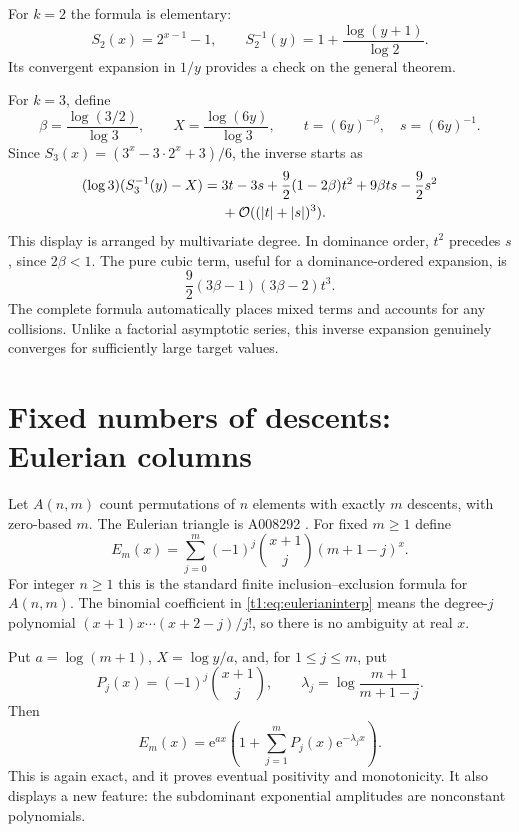 \documentclass[11pt,openany]{book}
\numberwithin{equation}{chapter}
\theoremstyle{plain}
\theoremstyle{definition}
\theoremstyle{remark}
\newcommand{\ee}{\mathrm e}
\begin{document}
For $k=2$ the formula is elementary:
\[
 S_2(x)=2^{x-1}-1,\qquad
 S_2^{-1}(y)=1+\frac{\log(y+1)}{\log2}.
\]
Its convergent expansion in $1/y$ provides a check on the general theorem.

For $k=3$, define
\[
 \beta=\frac{\log(3/2)}{\log3},\qquad
 X=\frac{\log(6y)}{\log3},\qquad
 t=(6y)^{-\beta},\quad s=(6y)^{-1}.
\]
Since $S_3(x)=(3^x-3\cdot2^x+3)/6$, the inverse starts as
\begin{align}
 (\log3)(S_3^{-1}(y)-X)
 ={}&3t-3s+\frac92(1-2\beta)t^2+9\beta ts-\frac92s^2
 \nonumber\\
 &+\mathcal O((|t|+|s|)^3).
 \label{t2:eq:stirling3-inverse}
\end{align}
This display is arranged by multivariate degree. In dominance order, $t^2$ precedes $s$, since $2\beta<1$. The pure cubic term, useful for a dominance-ordered expansion, is
\[
 \frac92(3\beta-1)(3\beta-2)t^3.
\]
The complete formula automatically places mixed terms and accounts for any collisions. Unlike a factorial asymptotic series, this inverse expansion genuinely converges for sufficiently large target values.
\section{Fixed numbers of descents: Eulerian columns}
Let $A(n,m)$ count permutations of $n$ elements with exactly $m$ descents, with zero-based $m$. The Eulerian triangle is A008292 \cite{oeiseulerian}. For fixed $m\ge1$ define
\begin{equation}
 E_m(x)=\sum_{j=0}^m(-1)^j\binom{x+1}{j}(m+1-j)^x.
 \label{t1:eq:eulerianinterp}
\end{equation}
For integer $n\ge1$ this is the standard finite inclusion--exclusion formula for $A(n,m)$. The binomial coefficient in \eqref{t1:eq:eulerianinterp} means the degree-$j$ polynomial $(x+1)x\cdots(x+2-j)/j!$, so there is no ambiguity at real $x$.

Put $a=\log(m+1)$, $X=\log y/a$, and, for $1\le j\le m$, put
\[
 P_j(x)=(-1)^j\binom{x+1}{j},\qquad
 \lambda_j=\log\frac{m+1}{m+1-j}.
\]
Then
\begin{equation}
 E_m(x)=\ee^{ax}\left(1+\sum_{j=1}^mP_j(x)\ee^{-\lambda_jx}\right).
 \label{t1:eq:eulerianforward}
\end{equation}
This is again exact, and it proves eventual positivity and monotonicity. It also displays a new feature: the subdominant exponential amplitudes are nonconstant polynomials.
\end{document}
